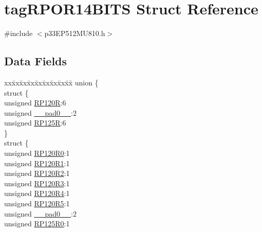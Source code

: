 \hypertarget{structtag_r_p_o_r14_b_i_t_s}{}\section{tag\+R\+P\+O\+R14\+B\+I\+TS Struct Reference}
\label{structtag_r_p_o_r14_b_i_t_s}


{\ttfamily \#include $<$p33\+E\+P512\+M\+U810.\+h$>$}

\subsection*{Data Fields}
\begin{DoxyCompactItemize}
\item 
\begin{tabbing}
xx\=xx\=xx\=xx\=xx\=xx\=xx\=xx\=xx\=\kill
union \{\\
\>struct \{\\
\>\>unsigned \hyperlink{structtag_r_p_o_r14_b_i_t_s_a9281bc8d9df3c1f418de0f9bef83d2bb}{RP120R}:6\\
\>\>unsigned \hyperlink{structtag_r_p_o_r14_b_i_t_s_adf71f3d8410c1f1dbbc96680a92c49af}{\_\_pad0\_\_}:2\\
\>\>unsigned \hyperlink{structtag_r_p_o_r14_b_i_t_s_a9e37aed38a983e73cf8713df29beb745}{RP125R}:6\\
\>\} \\
\>struct \{\\
\>\>unsigned \hyperlink{structtag_r_p_o_r14_b_i_t_s_a873060155f61bf1bed5814acb8d46f11}{RP120R0}:1\\
\>\>unsigned \hyperlink{structtag_r_p_o_r14_b_i_t_s_a10b8a3f32400470c9e60ca3013ad569a}{RP120R1}:1\\
\>\>unsigned \hyperlink{structtag_r_p_o_r14_b_i_t_s_a5ada792834c5c50751cdea9a489e03c5}{RP120R2}:1\\
\>\>unsigned \hyperlink{structtag_r_p_o_r14_b_i_t_s_a2236475da830ce87d1e05b5c0ed72d7c}{RP120R3}:1\\
\>\>unsigned \hyperlink{structtag_r_p_o_r14_b_i_t_s_a517cc6afe0889a23ff5c7b1fa7adc913}{RP120R4}:1\\
\>\>unsigned \hyperlink{structtag_r_p_o_r14_b_i_t_s_a776abb5416cc837d98958d15332bf7c2}{RP120R5}:1\\
\>\>unsigned \hyperlink{structtag_r_p_o_r14_b_i_t_s_adf71f3d8410c1f1dbbc96680a92c49af}{\_\_pad0\_\_}:2\\
\>\>unsigned \hyperlink{structtag_r_p_o_r14_b_i_t_s_aea52083d389990db5289c56528dba292}{RP125R0}:1\\

\end{tabbing}
\end{DoxyCompactItemize}
